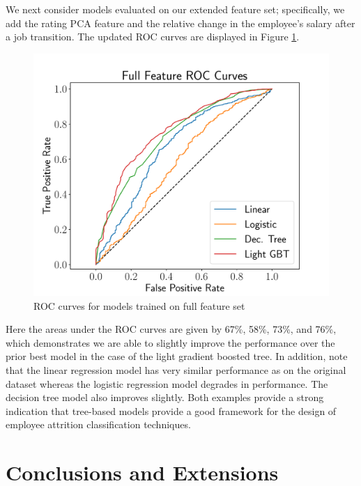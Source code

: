 \documentclass[10pt]{article}
\begin{document}
We next consider models evaluated on our extended feature set; specifically, we add the 
rating PCA feature and the relative change in the employee's salary after a job transition. 
The updated ROC curves are displayed in Figure \ref{fig:fullroc}.
%
\begin{figure}[thb]
    \centering
	\includegraphics[width=1.0\linewidth]{fullROC.pdf}
	\caption{ROC curves for models trained on full feature set}
	\label{fig:fullroc}
\end{figure}
%
Here the areas under the ROC curves are given by 67\%, 58\%, 73\%, and 76\%, which demonstrates 
we are able to slightly improve the performance over the prior best model in the case of the 
light gradient boosted tree.  In addition, note that the linear regression model has very similar 
performance as on the original dataset whereas the logistic regression model degrades in performance.  
The decision 
tree model also improves slightly.  Both examples provide a strong indication that tree-based models 
provide a good framework for the design of employee attrition classification techniques. 

\section{Conclusions and Extensions} \label{consec}
\end{document}
